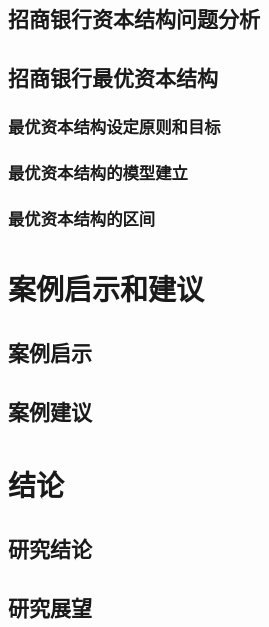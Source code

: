 \section{招商银行资本结构问题分析}

\section{招商银行最优资本结构}
\subsection{最优资本结构设定原则和目标}
\subsection{最优资本结构的模型建立}
\subsection{最优资本结构的区间}


\chapter{案例启示和建议}
\section{案例启示}
\section{案例建议}

\chapter{结论}
\section{研究结论}
\section{研究展望}